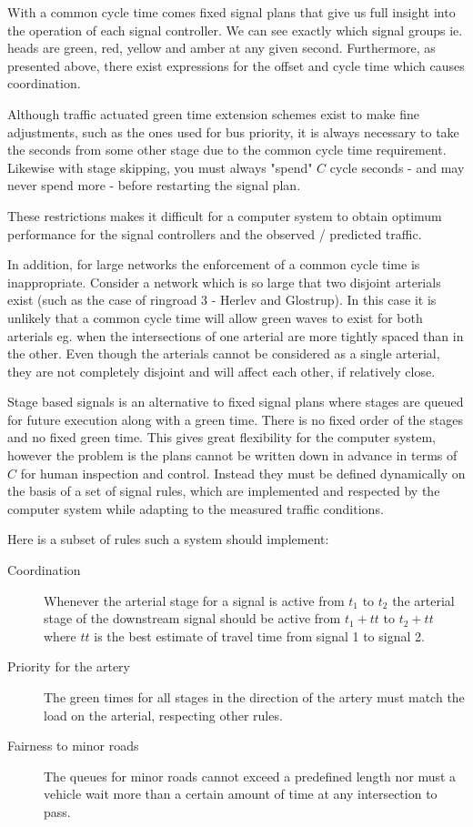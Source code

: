 With a common cycle time comes fixed signal plans that give us full insight into the operation of each signal controller. We can see exactly which signal groups ie. heads are green, red, yellow and amber at any given second. Furthermore, as presented above, there exist expressions for the offset and cycle time which causes coordination. 

Although traffic actuated green time extension schemes exist to make fine adjustments, such as the ones used for bus priority, it is always necessary to take the seconds from some other stage due to the common cycle time requirement. Likewise with stage skipping, you must always "spend" $C$ cycle seconds - and may never spend more - before restarting the signal plan.

These restrictions makes it difficult for a computer system to obtain optimum performance for the signal controllers and the observed / predicted traffic.

In addition, for large networks the enforcement of a common cycle time is inappropriate. Consider a network which is so large that two disjoint arterials exist (such as the case of ringroad 3 - Herlev and Glostrup). In this case it is unlikely that a common cycle time will allow green waves to exist for both arterials eg. when the intersections of one arterial are more tightly spaced than in the other. Even though the arterials cannot be considered as a single arterial, they are not completely disjoint and will affect each other, if relatively close.

Stage based signals is an alternative to fixed signal plans where stages are queued for future execution along with a green time. There is no fixed order of the stages and no fixed green time. This gives great flexibility for the computer system, however the problem is the plans cannot be written down in advance in terms of $C$ for human inspection and control. Instead they must be defined dynamically on the basis of a set of signal rules, which are implemented and respected by the computer system while adapting to the measured traffic conditions. 

Here is a subset of rules such a system should implement:

\begin{description}
\item[Coordination]
Whenever the arterial stage for a signal is active from $t_1$ to $t_2$ the arterial stage of the downstream signal should be active from $t_1 + tt$ to $t_2 + tt$ where $tt$ is the best estimate of travel time from signal 1 to signal 2.
\item[Priority for the artery]
The green times for all stages in the direction of the artery must match the load on the arterial, respecting other rules.
\item[Fairness to minor roads]
The queues for minor roads cannot exceed a predefined length nor must a vehicle wait more than a certain amount of time at any intersection to pass.
\end{description}

